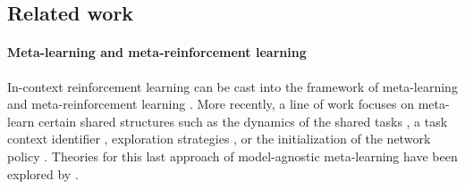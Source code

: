 \documentclass[10pt]{article}
\newcommand{\<}{\left\langle}
\renewcommand{\>}{\right\rangle}
\newcommand{\authnote}[2]{{\scriptsize $\ll$\textsf{#1 notes: #2}$\gg$}}
\newcommand{\authnote}[2]{}
\newcommand{\yub}[1]{{\color{red}\authnote{Yu}{#1}}}
\begin{document}

    
    



\subsection{Related work}\label{sec:related-work}

\paragraph{Meta-learning and meta-reinforcement learning} In-context reinforcement learning can be cast into the framework of meta-learning and meta-reinforcement learning \citep{schmidhuber1987evolutionary, schmidhuber1992learning, bengio1990learning, naik1992meta, ishii2002control, schaul2010metalearning, thrun2012learning}. More recently, a line of work focuses on meta-learn certain shared structures such as the dynamics of the shared tasks \citep{fu2016one, nagabandi2018learning}, a task context identifier \citep{rakelly2019efficient, humplik2019meta, zintgraf2019varibad}, exploration strategies \citep{gupta2018meta}, or the initialization of the network policy \citep{finn2017model, hochreiter2001learning, nichol2018first, rothfuss2018promp}. Theories for this last approach of model-agnostic meta-learning have been explored by \cite{wang2020global}. 
\end{document}
